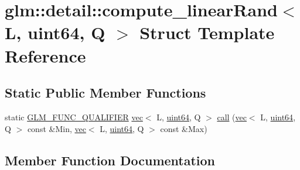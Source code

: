 \hypertarget{structglm_1_1detail_1_1compute__linear_rand_3_01_l_00_01uint64_00_01_q_01_4}{}\section{glm\+:\+:detail\+:\+:compute\+\_\+linear\+Rand$<$ L, uint64, Q $>$ Struct Template Reference}
\label{structglm_1_1detail_1_1compute__linear_rand_3_01_l_00_01uint64_00_01_q_01_4}
\subsection*{Static Public Member Functions}
\begin{DoxyCompactItemize}
\item 
static \mbox{\hyperlink{setup_8hpp_a33fdea6f91c5f834105f7415e2a64407}{G\+L\+M\+\_\+\+F\+U\+N\+C\+\_\+\+Q\+U\+A\+L\+I\+F\+I\+ER}} \mbox{\hyperlink{structglm_1_1vec}{vec}}$<$ L, \mbox{\hyperlink{namespaceglm_1_1detail_adec4b19bf4982125e122db2fe03c5810}{uint64}}, Q $>$ \mbox{\hyperlink{structglm_1_1detail_1_1compute__linear_rand_3_01_l_00_01uint64_00_01_q_01_4_a802cbce0e4da77e16718ffb2657a821b}{call}} (\mbox{\hyperlink{structglm_1_1vec}{vec}}$<$ L, \mbox{\hyperlink{namespaceglm_1_1detail_adec4b19bf4982125e122db2fe03c5810}{uint64}}, Q $>$ const \&Min, \mbox{\hyperlink{structglm_1_1vec}{vec}}$<$ L, \mbox{\hyperlink{namespaceglm_1_1detail_adec4b19bf4982125e122db2fe03c5810}{uint64}}, Q $>$ const \&Max)
\end{DoxyCompactItemize}


\subsection{Member Function Documentation}
\mbox{\label{structglm_1_1detail_1_1compute__linear_rand_3_01_l_00_01uint64_00_01_q_01_4_a802cbce0e4da77e16718ffb2657a821b}} 
